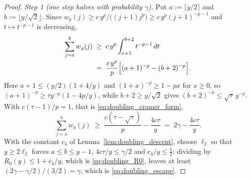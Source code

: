 \begin{proof}
\emph{Step 1 (one step halves with probability $\gamma$).} Put $a:=\lceil y/2\rceil$ and
$b:=\lfloor y/\sqrt2\rfloor$. Since $w_y(j)\geq c\,y^{p}/\bigl((j+1)j^{p}\bigr)\geq
c\,y^{p}(j+1)^{-p-1}$ and $t\mapsto t^{-p-1}$ is decreasing,
\begin{equation}
\begin{aligned}
    \sum_{j=a}^{b}w_y(j)\;&\geq\;c\,y^{p}\int_{a+1}^{b+2}t^{-p-1}\,dt\\
    &=\;\frac{c\,y^{p}}{p}\Bigl[(a+1)^{-p}-(b+2)^{-p}\Bigr].
\end{aligned}
\end{equation}
Here $a+1\leq(y/2)(1+4/y)$ and $(1+x)^{-p}\geq1-px$ for $x\geq0$, so
$(a+1)^{-p}\geq\tau y^{-p}(1-4p/y)$, while $b+2\geq y/\sqrt2$ gives
$(b+2)^{-p}\leq\sqrt\tau\,y^{-p}$. With $c(\tau-1)/p=1$, that is
\eqref{eq:doubling_cramer_form},
\begin{equation}
    \sum_{j=a}^{b}w_y(j)\;\geq\;\frac{c(\tau-\sqrt\tau)}{p}-\frac{4c\tau}{y}
    \;=\;2\gamma-\frac{4c\tau}{y} .
\end{equation}
With the constant $c_4$ of Lemma~\ref{lem:doubling_descent}, choose $\ell_2$ so that
$y\geq2\ell_2$ forces $a\leq b\leq y-1$, $4c\tau/y\leq\gamma/2$ and $c_4/y\leq\tfrac12$;
dividing by $R_0(y)\leq1+c_4/y$, which is \eqref{eq:doubling_R0}, leaves at least
$(2\gamma-\gamma/2)/(3/2)=\gamma$, which is \eqref{eq:doubling_escape}.


\end{proof}
